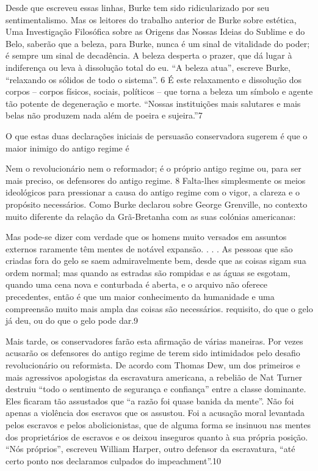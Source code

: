  \par 
Desde que escreveu essas linhas, Burke tem sido ridicularizado por seu sentimentalismo. Mas os leitores do trabalho anterior de Burke sobre estética, Uma Investigação Filosófica sobre as Origens das Nossas Ideias do Sublime e do Belo, saberão que a beleza, para Burke, nunca é um sinal de vitalidade do poder; é sempre um sinal de decadência. A beleza desperta o prazer, que dá lugar à indiferença ou leva à dissolução total do eu. “A beleza atua”, escreve Burke, “relaxando os sólidos de todo o sistema”. {\color{blue}6} É este relaxamento e dissolução dos corpos – corpos físicos, sociais, políticos – que torna a beleza um símbolo e agente tão potente de degeneração e morte. “Nossas instituições mais salutares e mais belas não produzem nada além de poeira e sujeira.”{\color{blue}7}
 \par 
O que estas duas declarações iniciais de persuasão conservadora sugerem é que o maior inimigo do antigo regime é
 \par 
Nem o revolucionário nem o reformador; é o próprio antigo regime ou, para ser mais preciso, os defensores do antigo regime. {\color{blue}8} Falta-lhes simplesmente os meios ideológicos para pressionar a causa do antigo regime com o vigor, a clareza e o propósito necessários. Como Burke declarou sobre George Grenville, no contexto muito diferente da relação da Grã-Bretanha com as suas colónias americanas:
 \par 
Mas pode-se dizer com verdade que os homens muito versados ​​em assuntos externos raramente têm mentes de notável expansão. . . . As pessoas que são criadas fora do gelo se saem admiravelmente bem, desde que as coisas sigam sua ordem normal; mas quando as estradas são rompidas e as águas se esgotam, quando uma cena nova e conturbada é aberta, e o arquivo não oferece precedentes, então é que um maior conhecimento da humanidade e uma compreensão muito mais ampla das coisas são necessários. requisito, do que o gelo já deu, ou do que o gelo pode dar.{\color{blue}9}
 \par 
Mais tarde, os conservadores farão esta afirmação de várias maneiras. Por vezes acusarão os defensores do antigo regime de terem sido intimidados pelo desafio revolucionário ou reformista. De acordo com Thomas Dew, um dos primeiros e mais agressivos apologistas da escravatura americana, a rebelião de Nat Turner destruiu “todo o sentimento de segurança e confiança” entre a classe dominante. Eles ficaram tão assustados que “a razão foi quase banida da mente”. Não foi apenas a violência dos escravos que os assustou. Foi a acusação moral levantada pelos escravos e pelos abolicionistas, que de alguma forma se insinuou nas mentes dos proprietários de escravos e os deixou inseguros quanto à sua própria posição. “Nós próprios”, escreveu William Harper, outro defensor da escravatura, “até certo ponto nos declaramos culpados do impeachment”.{\color{blue}10}
